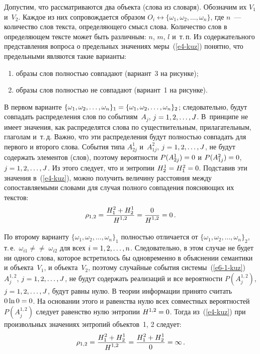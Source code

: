 \begin{multicols}{2}
     Допустим, что рассматриваются два объекта (слова из словаря). 
Обозначим их $V_1$ и~$V_2$. Каждое из них сопровождается образом 
$O_i\leftrightarrow \{\omega_1,\omega_2, \ldots ,\omega_n\}$, где $n$~--- 
количество слов текста, определяющего смысл слова. Количество слов в 
определяющем тексте может быть различным: $n$, $m$, $l$ и~т.\,п. Из 
содержательного представления вопроса о предельных значениях 
меры~(\ref{e4-kuz}) понятно, что предельными являются такие варианты: 
\begin{enumerate}[(1)]
\item образы слов полностью совпадают (вариант~3 на рисунке); 
\item образы слов 
полностью не совпадают (вариант~1 на рисунке). 
\end{enumerate}
     
     В первом варианте $\{\omega_1,\omega_2, \ldots ,\omega_n\}_1\hm= 
\{\omega_1,\omega_2, \ldots ,\omega_n\}_2$; следовательно, будут совпадать 
распределения слов по событиям~$A_j$, $j \hm= 1, 2, \ldots , J$. В~принципе не 
имеет значения, как распределятся слова по существительным, 
прилагательным, глаголам и~т.\,д. Важно, что эти распределения будут 
полностью совпадать для первого и второго слова. События типа $A^1_{2j}$ 
и~$A^2_{1j}$, $j \hm= 1, 2, \ldots , J$, не будут содержать элементов (слов), 
поэтому вероятности $P(A^1_{2j})\hm=0$ и $P(A^2_{1j})\hm=0$, $j \hm= 1, 2, 
\ldots , J$. Из этого следует, что и энтропии $H_2^1\hm=H_1^2\hm=0$. 
Подставив эти значения в~(\ref{e4-kuz}), можно получить величину расстояния 
между сопоставляемыми словами для случая полного совпадения поясняющих 
их текстов:
     $$
     \rho_{1,2}=\displaystyle\frac{\displaystyle H_1^2+H_2^1\mathstrut}{\displaystyle H^{1,2}\mathstrut}=\displaystyle\frac{\displaystyle 0\mathstrut}{\displaystyle H^{1,2}\mathstrut}=0\,.
     $$
     
     По второму варианту $\{\omega_1,\omega_2, \ldots ,\omega_n\}_1$ 
пол\-ностью отличается от $\{\omega_1,\omega_2, \ldots ,\omega_n\}_2$, 
     т.\,е.\ $\omega_{i1}\not=$\linebreak $\not=\;\omega_{i2}$ для всех $i \hm= 1, 2, \ldots , n$. 
Следовательно, в этом случае не будет ни одного слова, которое встретилось 
бы одновременно в объяснении семантики и объекта~$V_1$, и объекта~$V_2$, 
поэтому случайные события системы~(\ref{e6-1-kuz})~$A_j^{1,2}$, $j \hm= 1, 
2, \ldots , J$, не будут содержать реализаций и все вероятности $P(A_j^{1,2})$, 
$j \hm= 1, 2, \ldots , J$, будут равны нулю. В теории информации принято 
считать $0\ln0 \hm= 0$. На основании этого и равенства нулю всех совместных 
вероятностей $P(A_j^{1,2})$ следует равенство нулю энтропии 
$H^{1,2}\hm=0$. Тогда из~(\ref{e4-kuz}) при произвольных значениях 
энтропий объектов~1, 2 следует:
     $$
     \rho_{1,2}=\displaystyle\frac{\displaystyle H_1^2+H_2^1\mathstrut}{\displaystyle H^{1,2}\mathstrut}=\displaystyle\frac{\displaystyle H_1^2+H_2^1\mathstrut}{\displaystyle 0\mathstrut}=\infty\,.
     $$
     

\end{multicols}
